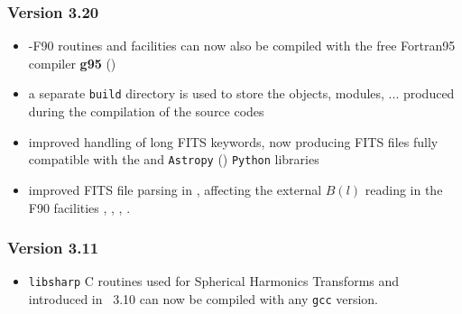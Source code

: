\documentclass[12pt,twoside]{article}
\newcommand{\compresslist}{%
\setlength{\itemsep}{0ex}}{}
\begin{document}
{\subsubsection{Version 3.20}
\begin{itemize}\compresslist
	\item \healpixns-F90 routines and facilities can now also be compiled with
the free Fortran95 compiler \textbf{g95} ()
 	\item a separate {\tt build} directory is used to store the objects,
modules, ... produced during the compilation of the source codes
	\item improved handling of long FITS keywords, now producing FITS files
fully compatible with the
and 
{\tt Astropy} ()
{\tt Python} libraries
	\item improved FITS file parsing in 
,
affecting the external $B(l)$ reading in the F90 facilities 
, 
, 
, 
.
\end{itemize}

\subsubsection{Version 3.11}
\begin{itemize}\compresslist
	\item {\tt libsharp} C routines used for Spherical Harmonics Transforms 
and introduced in \healpix\ 3.10
can now be compiled with any {\tt gcc} version.
\end{itemize}

}
\end{document}

